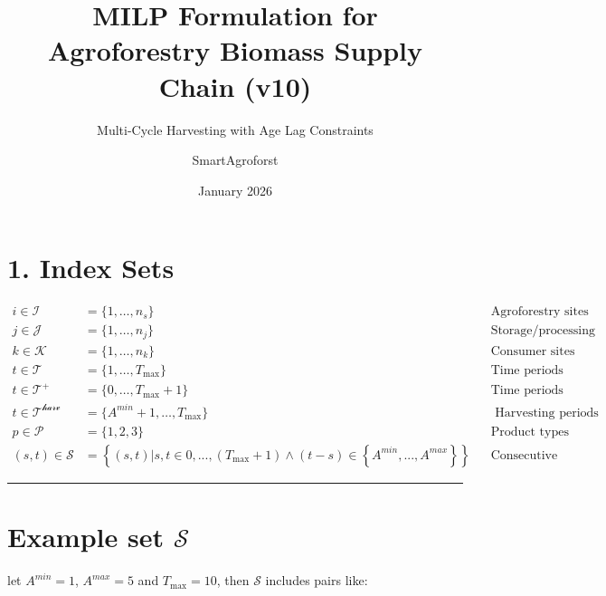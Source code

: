 \documentclass[
  11pt,
  11pt,
  a4paper]{article}
\title{MILP Formulation for Agroforestry Biomass Supply Chain (v10)}
\subtitle{Multi-Cycle Harvesting with Age Lag Constraints}
\author{SmartAgroforst}
\date{January 2026}
\begin{document}
\maketitle

{
\hypersetup{linkcolor=}
\setcounter{tocdepth}{3}
\tableofcontents
}
\section{1. Index Sets}\label{index-sets}

\begin{align}
i \in \mathcal{I} &= \{1, \ldots, n_s\} && \text{Agroforestry sites} \\
j \in \mathcal{J} &= \{1, \ldots, n_j\} && \text{Storage/processing facilities} \\
k \in \mathcal{K} &= \{1, \ldots, n_k\} && \text{Consumer sites} \\
t \in \mathcal{T} &= \{1, \ldots, T_{\max}\} && \text{Time periods (years)} \\
t \in \mathcal{T^+} &= \{0, \ldots, T_{\max}+1\} && \text{Time periods (years)} \\
t \in \mathcal{T^{harv}} &= \{A^{min}+1, \ldots, T_{\max}\} && \text{ Harvesting periods (years)} \\
p \in \mathcal{P} &= \{1, 2, 3\} && \text{Product types (chemical, pulp, energy)} \\
(s,t) \in \mathcal{S} &= \left\{(s,t) | s,t \in 0,...,(T_{\max}+1) \wedge (t-s) \in \left\{A^{min},...,A^{max}\right\} \right\} && \text{Consecutive harvesting}
\end{align}

\begin{center}\rule{0.5\linewidth}{0.5pt}\end{center}

\section{\texorpdfstring{Example set
\(\mathcal{S}\)}{Example set \textbackslash mathcal\{S\}}}\label{example-set-mathcals}

let \(A^{min}=1\), \(A^{max}=5\) and \(T_{\max}=10\), then
\(\mathcal{S}\) includes pairs like:
\end{document}
